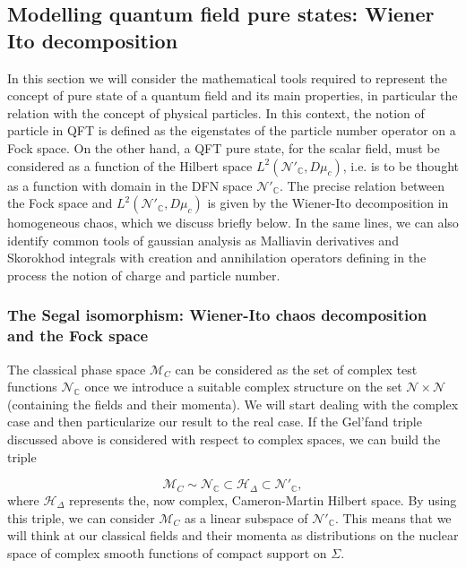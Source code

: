 \documentclass[12pt]{article}%
\begin{document}
\subsection{Modelling quantum field pure states: Wiener Ito decomposition}
In this section we will consider the mathematical tools required to represent the concept of pure state of a quantum field and its main properties, in particular the relation with the concept of physical particles. In this context, the notion of particle in QFT is defined as the eigenstates of the  particle number operator on a Fock space. On the other hand, a QFT pure state, for the scalar field, must be considered as a function of the Hilbert space $L^2(\mathcal{N}'_\mathbb{C}, D\mu_c)$, i.e. is to be thought as a function with domain in the DFN space  $\mathcal{N}'_\mathbb{C}$. The precise relation between the Fock space and $L^2(\mathcal{N}'_\mathbb{C}, D\mu_c)$ is given by the Wiener-Ito decomposition in homogeneous chaos, which we discuss briefly below. In the same lines, we can also identify common tools of gaussian analysis as Malliavin derivatives and Skorokhod integrals with creation and annihilation operators defining in the process the notion of charge and particle number. 



\subsubsection{The Segal isomorphism: Wiener-Ito chaos decomposition and the Fock space}
The classical phase space $\mathcal{M}_C$ can be considered as the set of complex test functions $\mathcal{N}_\mathbb{C}$ once we introduce a suitable complex structure on the set $\mathcal{N}\times \mathcal{N}$ (containing the fields and their momenta). We will start dealing with the complex case and then particularize our result to the real case. If the Gel'fand triple discussed above is considered with respect to complex spaces, we can build the triple

\begin{equation}
\label{eq:complexgelfand}
\mathcal{M}_C\sim \mathcal{N}_\mathbb{C}\subset \mathcal{H}_\Delta\subset \mathcal{N}'_\mathbb{C},
\end{equation}
 where $\mathcal{H}_\Delta$ represents the, now complex, Cameron-Martin Hilbert space. By using this triple, we can consider $\mathcal{M}_C$ as a linear subspace of $\mathcal{N}'_\mathbb{C}$. This means that we will think at our classical fields and their momenta as distributions on the nuclear space of complex smooth functions of compact support on $\Sigma$.
\end{document}

